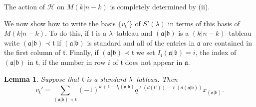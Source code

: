 \documentclass[twoside]{amsart}
\numberwithin{equation}{section}
\newtheorem{Lemma}[equation]{Lemma}
\theoremstyle{remark}
\def\len(#1){\ell(#1)}
\def\H{\mathscr H}
\def\a{\mathfrak a}
\def\b{\mathfrak b}
\def\t{\mathfrak t}
\begin{document}
The action of $\H$ on $M(k|n-k)$ is completely determined by (ii).

We now show how to write the basis $\{v_\t'\}$ of $S'(\lambda)$ in
terms of this basis of $M(k|n-k)$. To do this, if $\t$ is a
$\lambda$--tableau and $(\a|\b)$ is a $(k|n{-}k)$--tableau write
$(\a|\b)\prec\t$ if $(\a|\b)$ is standard and all of the entries in
$\a$ are contained in the first column of $\t$. Finally, if
$(\a|\b)\prec\t$ we set $I_\t(\a|\b)=i$, the index of $(\a|\b)$ in
$\t$, if the number in row $i$ of $\t$ does not appear in $\a$.

\begin{Lemma}\label{+lot}
Suppose that $\t$ is a standard $\lambda$--tableau. Then
$$v_\t'=\sum_{(\a|\b)\prec\t}
   (-1)^{k+1-I_\t(\a|\b)}q^{\len(d(\t'))-\len(d(\a|\b))}x_{(\a|\b)}.$$
\end{Lemma}
\end{document}
